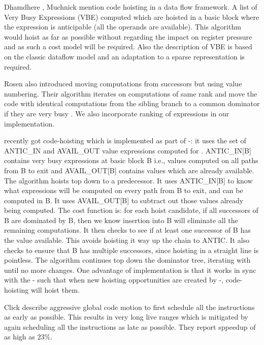 \documentclass[acmlarge,review]{acmart}\settopmatter{printfolios=true}
\begin{document}
Dhamdhere \cite{dhamdhere1988fast}, Muchnick \cite{steven1997advanced} mention
code hoisting in a data flow framework. A list of Very Busy Expressions (VBE)
computed which are hoisted in a basic block where the expression is
anticipable (all the operands are available). This algorithm would hoist as far
as possible without regarding the impact on register pressure and as such a cost
model will be required.  Also the description of VBE is based on the classic
dataflow model and an adaptation to a sparse \SSA{} representation is required.

Rosen \cite{rosen1988global} also introduced moving computations from successors
but using value numbering. Their algorithm iterates on computations of same rank
and move the code with identical computations from the sibling branch to a
common dominator if they are very busy \cite{steven1997advanced}. We also
incorporate ranking of expressions in our implementation.

\GCC{} recently got code-hoisting \cite{GCCCodeHoisting} which is implemented as
part of \GVN{}-\PRE{}: it uses the set of ANTIC\_IN and AVAIL\_OUT value
expressions computed for \PRE{}. ANTIC\_IN[B] contains very busy expressions at
basic block B i.e., values computed on all paths from B to exit and
AVAIL\_OUT[B] contains values which are already available. The algorithm hoists
top down to a predecessor.  It uses ANTIC\_IN[B] to know what expressions will
be computed on every path from B to exit, and can be computed in B.  It uses
AVAIL\_OUT[B] to subtract out those values already being computed.  The cost
function is: for each hoist candidate, if all successors of B are dominated by
B, then we know insertion into B will eliminate all the remaining computations.
It then checks to see if at least one successor of B has the value available.
This avoids hoisting it way up the chain to ANTIC.  It also checks to ensure
that B has multiple successors, since hoisting in a straight line is pointless.
The algorithm continues top down the dominator tree, iterating with \PRE{} until
no more changes.  One advantage of \GCC{} implementation is that it works in
sync with the \GVN{}-\PRE{} such that when new hoisting opportunities are
created by \GVN{}-\PRE{}, code-hoisting will hoist them.

Click \cite{click1995global} describe aggressive global code motion to first
schedule all the instructions as early as possible. This results in very long
live ranges which is mitigated by again scheduling all the instructions as late
as possible. They report sppeedup of as high as $23\%$.
\end{document}
